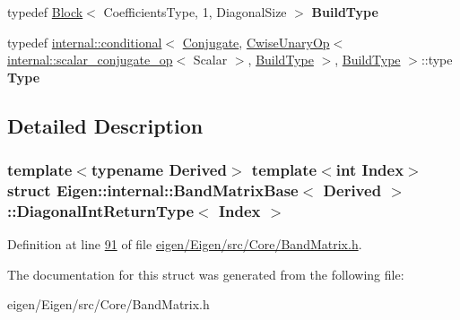 \begin{DoxyCompactItemize}
\mbox{\label{struct_eigen_1_1internal_1_1_band_matrix_base_1_1_diagonal_int_return_type_af5b1872c1f56aea6549d756fa9b4b140}} 
typedef \hyperlink{group___core___module_class_eigen_1_1_block}{Block}$<$ Coefficients\+Type, 1, Diagonal\+Size $>$ {\bfseries Build\+Type}
\item 
\mbox{\label{struct_eigen_1_1internal_1_1_band_matrix_base_1_1_diagonal_int_return_type_ab71da0865441b0fdc0cfa64491dd3e00}} 
typedef \hyperlink{struct_eigen_1_1internal_1_1conditional}{internal\+::conditional}$<$ \hyperlink{class_eigen_1_1_conjugate}{Conjugate}, \hyperlink{group___core___module_class_eigen_1_1_cwise_unary_op}{Cwise\+Unary\+Op}$<$ \hyperlink{struct_eigen_1_1internal_1_1scalar__conjugate__op}{internal\+::scalar\+\_\+conjugate\+\_\+op}$<$ Scalar $>$, \hyperlink{group___core___module_class_eigen_1_1_block}{Build\+Type} $>$, \hyperlink{group___core___module_class_eigen_1_1_block}{Build\+Type} $>$\+::type {\bfseries Type}
\end{DoxyCompactItemize}


\subsection{Detailed Description}
\subsubsection*{template$<$typename Derived$>$\newline
template$<$int Index$>$\newline
struct Eigen\+::internal\+::\+Band\+Matrix\+Base$<$ Derived $>$\+::\+Diagonal\+Int\+Return\+Type$<$ Index $>$}



Definition at line \hyperlink{eigen_2_eigen_2src_2_core_2_band_matrix_8h_source_l00091}{91} of file \hyperlink{eigen_2_eigen_2src_2_core_2_band_matrix_8h_source}{eigen/\+Eigen/src/\+Core/\+Band\+Matrix.\+h}.



The documentation for this struct was generated from the following file\+:\begin{DoxyCompactItemize}
\item 
eigen/\+Eigen/src/\+Core/\+Band\+Matrix.\+h\end{DoxyCompactItemize}

